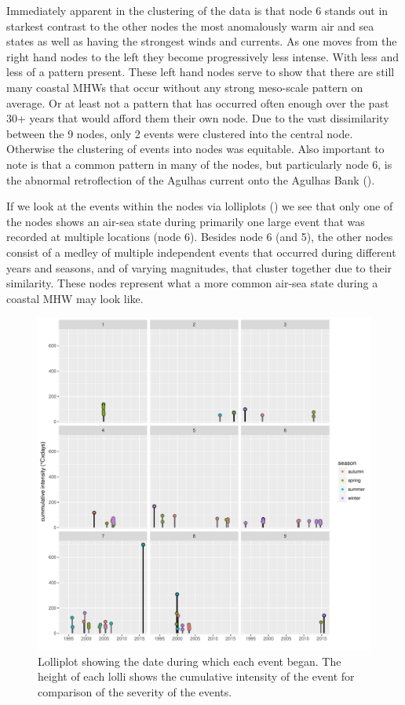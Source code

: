 \documentclass[a4paper,10pt,review]{elsarticle}
\begin{document}
Immediately apparent in the clustering of the data is that node 6 stands out in starkest contrast to the other nodes the most anomalously warm air and sea states as well as having the strongest winds and currents. As one moves from the right hand nodes to the left they become progressively less intense. With less and less of a pattern present. These left hand nodes serve to show that there are still many coastal MHWs that occur without any strong meso-scale pattern on average. Or at least not a pattern that has occurred often enough over the past 30+ years that would afford them their own node. Due to the vast dissimilarity between the 9 nodes, only 2 events were clustered into the central node. Otherwise the clustering of events into nodes was equitable. Also important to note is that a common pattern in many of the nodes, but particularly node 6, is the abnormal retroflection of the Agulhas current onto the Agulhas Bank ().

If we look at the events within the nodes via lolliplots () we see that only one of the nodes shows an air-sea state during primarily one large event that was recorded at multiple locations (node 6). Besides node 6 (and 5), the other nodes consist of a medley of multiple independent events that occurred during different years and seasons, and of varying magnitudes, that cluster together due to their similarity. These nodes represent what a more common air-sea state during a coastal MHW may look like.

\begin{figure}
\includegraphics[width=1.0\textwidth]{figure_5.pdf}
\caption{Lolliplot showing the date during which each event began. The height of each lolli shows the cumulative intensity of the event for comparison of the severity of the events.}
\label{figure5}
\end{figure}
\end{document}

